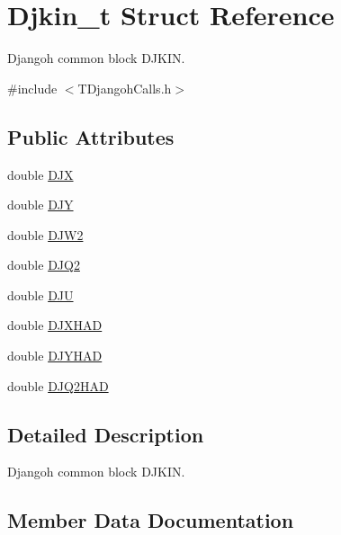 \hypertarget{struct_djkin__t}{}\section{Djkin\+\_\+t Struct Reference}
\label{struct_djkin__t}


Djangoh common block D\+J\+K\+IN.  




{\ttfamily \#include $<$T\+Djangoh\+Calls.\+h$>$}

\subsection*{Public Attributes}
\begin{DoxyCompactItemize}
\item 
double \hyperlink{struct_djkin__t_a9900a2384f450d8591e5b6b6c52252ec}{D\+JX}
\item 
double \hyperlink{struct_djkin__t_aafc30d1a65485334fd983b244c5ad09b}{D\+JY}
\item 
double \hyperlink{struct_djkin__t_adb92e09d575e29f0e772d81fcbb7cfef}{D\+J\+W2}
\item 
double \hyperlink{struct_djkin__t_a691b9575a511a0cae727ccc010c6ae22}{D\+J\+Q2}
\item 
double \hyperlink{struct_djkin__t_ab8a055c1530aae9b3f8e06a03066776d}{D\+JU}
\item 
double \hyperlink{struct_djkin__t_a6d9bd459f35587ebd7790a39911703a4}{D\+J\+X\+H\+AD}
\item 
double \hyperlink{struct_djkin__t_acb3aa9109215ecdd8fc000059755bd72}{D\+J\+Y\+H\+AD}
\item 
double \hyperlink{struct_djkin__t_a9fefd2057e79a1ea5ac6c61a82f0f2e7}{D\+J\+Q2\+H\+AD}
\end{DoxyCompactItemize}


\subsection{Detailed Description}
Djangoh common block D\+J\+K\+IN. 

\subsection{Member Data Documentation}
\mbox{\label{struct_djkin__t_a691b9575a511a0cae727ccc010c6ae22}} 
